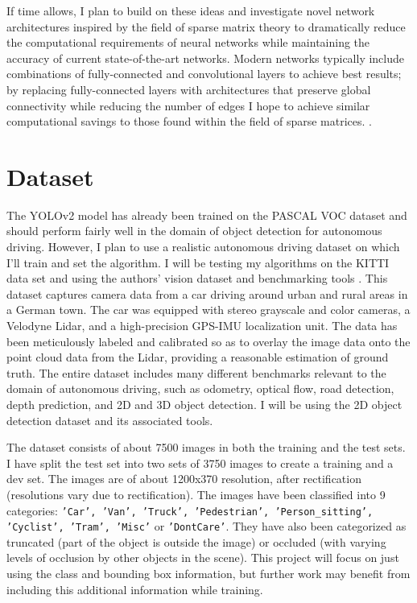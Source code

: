 \documentclass[10pt,letterpaper]{article}
\begin{document}
	If time allows, I plan to build on these ideas and investigate novel network architectures inspired by the field of sparse matrix theory to dramatically reduce the computational requirements of neural networks while maintaining the accuracy of current state-of-the-art networks. Modern networks typically include combinations of fully-connected and convolutional layers to achieve best results; by replacing fully-connected layers with architectures that preserve global connectivity while reducing the number of edges I hope to achieve similar computational savings to those found within the field of sparse matrices. \cite{Novikov2015,V.Oseledets2011,Han2015}. 
	
	\section{Dataset}
	The YOLOv2 model has already been trained on the PASCAL VOC dataset and should perform fairly well in the domain of object detection for autonomous driving. However, I plan to use a realistic autonomous driving dataset on which I'll train and set the algorithm. I will be testing my algorithms on the KITTI data set \cite{KITTIDataset} and using the authors' vision dataset and benchmarking tools \cite{KITTIVision}. This dataset captures camera data from a car driving around urban and rural areas in a German town. The car was equipped with stereo grayscale and color cameras, a Velodyne Lidar, and a high-precision GPS-IMU localization unit. The data has been meticulously labeled and calibrated so as to overlay the image data onto the point cloud data from the Lidar, providing a reasonable estimation of ground truth. The entire dataset includes many different benchmarks relevant to the domain of autonomous driving, such as odometry, optical flow, road detection, depth prediction, and 2D and 3D object detection. I will be using the 2D object detection dataset and its associated tools. 
	
	The dataset consists of about 7500 images in both the training and the test sets. I have split the test set into two sets of 3750 images to create a training and a dev set. The images are of about 1200x370 resolution, after rectification (resolutions vary due to rectification). The images have been classified into 9 categories: \texttt{'Car', 'Van', 'Truck',	'Pedestrian', 'Person\_sitting', 'Cyclist', 'Tram', 'Misc'} or \texttt{'DontCare'}. They have also been categorized as truncated (part of the object is outside the image) or occluded (with varying levels of occlusion by other objects in the scene). This project will focus on just using the class and bounding box information, but further work may benefit from including this additional information while training. 
	
\end{document}
